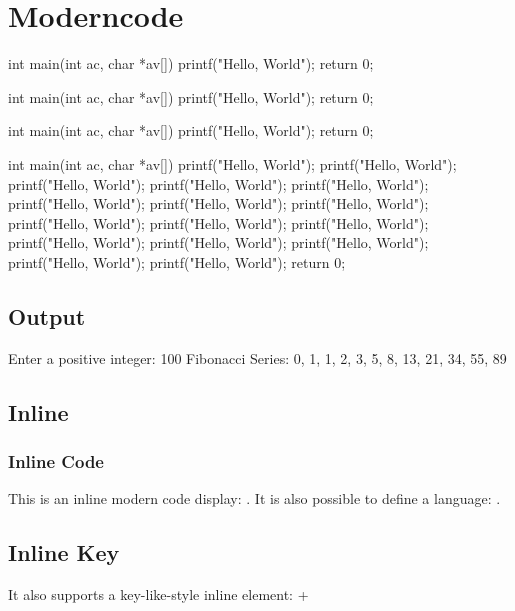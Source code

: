 \documentclass[10pt]{article}
\begin{document}
\section{Moderncode}

\begin{moderncode}[C][][adjusted title={Title}]
int main(int ac, char *av[])
{
	printf("Hello, World");
	return 0;
}
\end{moderncode}

\begin{moderncode}[C][][adjusted title={This title is very very very very very very very very very long}]
int main(int ac, char *av[])
{
	printf("Hello, World");
	return 0;
}
\end{moderncode}

\begin{moderncode}[C]
int main(int ac, char *av[])
{
	printf("Hello, World");
	return 0;
}
\end{moderncode}

\begin{moderncode}[C][][adjusted title={This is a very long code}]
int main(int ac, char *av[])
{
	printf("Hello, World");
	printf("Hello, World");
	printf("Hello, World");
	printf("Hello, World");
	printf("Hello, World");
	printf("Hello, World");
	printf("Hello, World");
	printf("Hello, World");
	printf("Hello, World");
	printf("Hello, World");
	printf("Hello, World");
	printf("Hello, World");
	printf("Hello, World");
	printf("Hello, World");
	printf("Hello, World");
	printf("Hello, World");
	return 0;
}
\end{moderncode}


\subsection{Output}

\begin{moderncodeout}
Enter a positive integer: 100
Fibonacci Series: 0, 1, 1, 2, 3, 5, 8, 13, 21, 34, 55, 89
\end{moderncodeout}

\subsection{Inline}

\subsubsection{Inline Code}

This is an inline modern code display: \moderncodeinline{\LaTeX}. It is also possible to define a language: .

\subsection{Inline Key}

It also supports a key-like-style inline element:  + 
\end{document}
